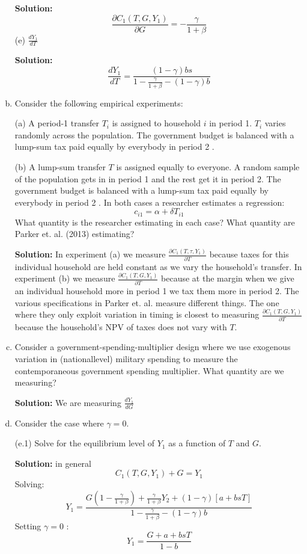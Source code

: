 \documentclass[11pt]{extarticle}
\theoremstyle{plain}
\theoremstyle{definition}
\begin{document}
\begin{enumerate}[(a)]
\textbf{Solution:}
$$
\frac{\partial C_1\left(T, G, Y_1\right)}{\partial G}=-\frac{\gamma}{1+\beta}
$$
(e) $\frac{d Y_1}{d T}$

\textbf{Solution:}
$$
\frac{d Y_1}{d T}=\frac{(1-\gamma) b s}{1-\frac{\gamma}{1+\beta}-(1-\gamma) b}
$$


\item Consider the following empirical experiments:

(a) A period-1 transfer $T_i$ is assigned to household $i$ in period 1. $T_i$ varies randomly across the population. The government budget is balanced with a lump-sum tax paid equally by everybody in period 2 .

(b) A lump-sum transfer $T$ is assigned equally to everyone. A random sample of the population gets in in period 1 and the rest get it in period 2. The government budget is balanced with a lump-sum tax paid equally by everybody in period 2 .
In both cases a researcher estimates a regression:
$$
c_{i 1}=\alpha+\delta T_{i 1}
$$
What quantity is the researcher estimating in each case? What quantity are Parker et. al. (2013) estimating?

\textbf{Solution:} In experiment (a) we measure $\frac{\partial C_1\left(T, \tau, Y_1\right)}{\partial T}$ because taxes for this individual household are held constant as we vary the household's transfer. In experiment (b) we measure $\frac{\partial C_1\left(T, G, Y_1\right)}{\partial T}$ because at the margin when we give an individual household more in period 1 we tax them more in period 2. The various specifications in Parker et. al. measure different things. The one where they only exploit variation in timing is closest to measuring $\frac{\partial C_1\left(T, G, Y_1\right)}{\partial T}$ because the household's NPV of taxes does not vary with $T$.

\item Consider a government-spending-multiplier design where we use exogenous variation in (nationallevel) military spending to measure the contemporaneous government spending multiplier. What quantity are we measuring?

\textbf{Solution:} We are measuring $\frac{d Y_1}{d G}$

\item  Consider the case where $\gamma=0$.

(e.1) Solve for the equilibrium level of $Y_1$ as a function of $T$ and $G$.

\textbf{Solution:} in general
$$
C_1\left(T, G, Y_1\right)+G=Y_1
$$
Solving:
$$
Y_1=\frac{G\left(1-\frac{\gamma}{1+\beta}\right)+\frac{\gamma}{1+\beta} Y_2+(1-\gamma)[a+b s T]}{1-\frac{\gamma}{1+\beta}-(1-\gamma) b}
$$
Setting $\gamma=0$ :
$$
Y_1=\frac{G+a+b s T}{1-b}
$$


\end{enumerate}
\end{document}
